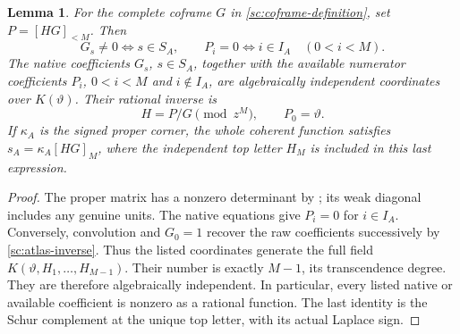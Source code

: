 \documentclass[11pt,a4paper]{amsart}
\numberwithin{equation}{section}
\theoremstyle{plain}
\newtheorem{lemma}[theorem]{Lemma}
\theoremstyle{definition}
\begin{document}
\begin{lemma}\label{sc:atlas}
For the complete coframe \(G\) in \eqref{sc:coframe-definition}, set
\(P=[HG]_{<M}\).  Then
\begin{equation}\label{sc:atlas-support}
 G_s\ne0\iff s\in S_A,\qquad
 P_i=0\iff i\in I_A\quad(0<i<M).
\end{equation}
The native coefficients \(G_s\), \(s\in S_A\), together with the
available numerator coefficients \(P_i\), \(0<i<M\) and \(i\notin I_A\),
are algebraically independent coordinates over \(K(\vartheta)\).  Their rational
inverse is
\begin{equation}\label{sc:atlas-inverse}
 H=P/G\pmod {z^M},\qquad P_0=\vartheta.
\end{equation}
If \(\kappa_A\) is the signed proper corner, the whole coherent function
satisfies \(s_A=\kappa_A[HG]_M\), where the independent top letter
\(H_M\) is included in this last expression.
\end{lemma}
\begin{proof}
The proper matrix has a nonzero determinant by
; its weak diagonal includes any genuine units.
The native equations give \(P_i=0\) for \(i\in I_A\).  Conversely,
convolution and \(G_0=1\) recover the raw coefficients successively by
\eqref{sc:atlas-inverse}.  Thus the listed coordinates generate the
full field \(K(\vartheta,H_1,\ldots,H_{M-1})\).  Their number is exactly
\(M-1\), its transcendence degree.  They are therefore algebraically
independent.  In particular, every listed native or available
coefficient is nonzero as a rational function.  The last identity is
the Schur complement at the unique top letter, with its actual
Laplace sign.
\end{proof}
\end{document}
